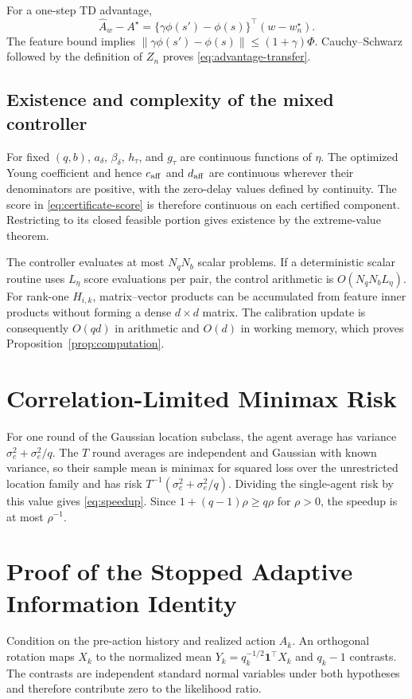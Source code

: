 For a one-step TD advantage,
\begin{equation}
\widehat A_w-A^\star
=\{\gamma\phi(s')-\phi(s)\}^\top(w-w_n^\star).
\end{equation}
The feature bound implies
$\|\gamma\phi(s')-\phi(s)\|\le(1+\gamma)\Phi$.
Cauchy--Schwarz followed by the definition of $Z_n$ proves \eqref{eq:advantage-transfer}.

\subsection{Existence and complexity of the mixed controller}
For fixed $(q,b)$, $a_\delta$, $\beta_\delta$, $h_\tau$, and $g_\tau$ are continuous functions of $\eta$.
The optimized Young coefficient and hence $c_{\rm aff}$ and $d_{\rm aff}$ are continuous wherever their denominators are positive, with the zero-delay values defined by continuity.
The score in \eqref{eq:certificate-score} is therefore continuous on each certified component.
Restricting to its closed feasible portion gives existence by the extreme-value theorem.

The controller evaluates at most $N_qN_b$ scalar problems.
If a deterministic scalar routine uses $L_\eta$ score evaluations per pair, the control arithmetic is $O(N_qN_bL_\eta)$.
For rank-one $H_{i,k}$, matrix--vector products can be accumulated from feature inner products without forming a dense $d\times d$ matrix.
The calibration update is consequently $O(qd)$ in arithmetic and $O(d)$ in working memory, which proves Proposition~\ref{prop:computation}.

\section{Correlation-Limited Minimax Risk}
For one round of the Gaussian location subclass, the agent average has variance $\sigma_c^2+\sigma_e^2/q$.
The $T$ round averages are independent and Gaussian with known variance, so their sample mean is minimax for squared loss over the unrestricted location family and has risk $T^{-1}(\sigma_c^2+\sigma_e^2/q)$.
Dividing the single-agent risk by this value gives \eqref{eq:speedup}.
Since $1+(q-1)\rho\ge q\rho$ for $\rho>0$, the speedup is at most $\rho^{-1}$.

\section{Proof of the Stopped Adaptive Information Identity}
Condition on the pre-action history and realized action $A_k$.
An orthogonal rotation maps $X_k$ to the normalized mean $Y_k=q_k^{-1/2}\bm{1}^\top X_k$ and $q_k-1$ contrasts.
The contrasts are independent standard normal variables under both hypotheses and therefore contribute zero to the likelihood ratio.

